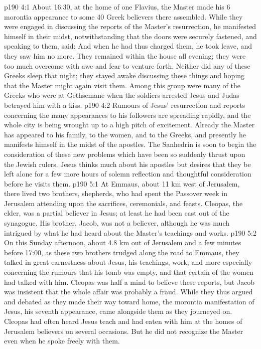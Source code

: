 \vs p190 4:1 About 16:30, at the home of one Flavius, the Master made his 6 morontia appearance to some 40 Greek believers there assembled. While they were engaged in discussing the reports of the Master’s resurrection, he manifested himself in their midst, notwithstanding that the doors were securely fastened, and speaking to them, said:  And when he had thus charged them, he took leave, and they saw him no more. They remained within the house all evening; they were too much overcome with awe and fear to venture forth. Neither did any of these Greeks sleep that night; they stayed awake discussing these things and hoping that the Master might again visit them. Among this group were many of the Greeks who were at Gethsemane when the soldiers arrested Jesus and Judas betrayed him with a kiss.
\vs p190 4:2 \pc Rumours of Jesus’ resurrection and reports concerning the many appearances to his followers are spreading rapidly, and the whole city is being wrought up to a high pitch of excitement. Already the Master has appeared to his family, to the women, and to the Greeks, and presently he manifests himself in the midst of the apostles. The Sanhedrin is soon to begin the consideration of these new problems which have been so suddenly thrust upon the Jewish rulers. Jesus thinks much about his apostles but desires that they be left alone for a few more hours of solemn reflection and thoughtful consideration before he visits them.
\vs p190 5:1 At Emmaus, about 11 km west of Jerusalem, there lived two brothers, shepherds, who had spent the Passover week in Jerusalem attending upon the sacrifices, ceremonials, and feasts. Cleopas, the elder, was a partial believer in Jesus; at least he had been cast out of the synagogue. His brother, Jacob, was not a believer, although he was much intrigued by what he had heard about the Master’s teachings and works.
\vs p190 5:2 On this Sunday afternoon, about 4.8 km out of Jerusalem and a few minutes before 17:00, as these two brothers trudged along the road to Emmaus, they talked in great earnestness about Jesus, his teachings, work, and more especially concerning the rumours that his tomb was empty, and that certain of the women had talked with him. Cleopas was half a mind to believe these reports, but Jacob was insistent that the whole affair was probably a fraud. While they thus argued and debated as they made their way toward home, the morontia manifestation of Jesus, his seventh appearance, came alongside them as they journeyed on. Cleopas had often heard Jesus teach and had eaten with him at the homes of Jerusalem believers on several occasions. But he did not recognize the Master even when he spoke freely with them.
